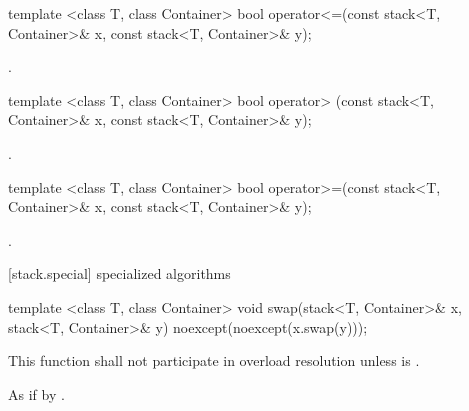 %
\begin{itemdecl}
template <class T, class Container>
  bool operator<=(const stack<T, Container>& x, const stack<T, Container>& y);
\end{itemdecl}

\begin{itemdescr}
\pnum
\returns
{}.
\end{itemdescr}

%
\begin{itemdecl}
template <class T, class Container>
  bool operator> (const stack<T, Container>& x, const stack<T, Container>& y);
\end{itemdecl}

\begin{itemdescr}
\pnum
\returns
{}.
\end{itemdescr}

%
\begin{itemdecl}
template <class T, class Container>
    bool operator>=(const stack<T, Container>& x, const stack<T, Container>& y);
\end{itemdecl}

\begin{itemdescr}
\pnum
\returns
{}.
\end{itemdescr}

[stack.special]{ specialized algorithms}

%
\begin{itemdecl}
template <class T, class Container>
  void swap(stack<T, Container>& x, stack<T, Container>& y) noexcept(noexcept(x.swap(y)));
\end{itemdecl}

\begin{itemdescr}
\pnum
\remarks
This function shall not participate in overload resolution
unless  is .

\pnum
\effects As if by .
\end{itemdescr}
